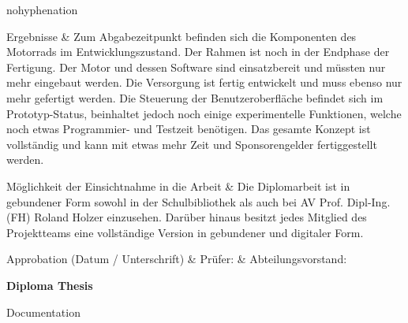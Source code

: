 {\begin{hyphenrules}{nohyphenation}
\begin{center}
\begin{mytable}
			\end{mytable}	
			\begin{mytable}
				Ergebnisse & Zum Abgabezeitpunkt befinden sich die Komponenten des Motorrads im Entwicklungszustand. Der Rahmen ist noch in der Endphase der Fertigung. Der Motor und dessen Software sind einsatzbereit und müssten nur mehr eingebaut werden. Die Versorgung ist fertig entwickelt und muss ebenso nur mehr gefertigt werden. Die Steuerung der Benutzeroberfläche befindet sich im Prototyp-Status, beinhaltet jedoch noch einige experimentelle Funktionen, welche noch etwas Programmier- und Testzeit benötigen. Das gesamte Konzept ist vollständig und kann mit etwas mehr Zeit und Sponsorengelder fertiggestellt werden. \\
			\end{mytable}\vskip-0.42cm
			\begin{mytable}
				Möglichkeit der Einsichtnahme in die Arbeit & Die Diplomarbeit ist in gebundener Form sowohl in der Schulbibliothek als auch bei AV Prof. Dipl-Ing. (FH) Roland Holzer einzusehen. Darüber hinaus besitzt jedes Mitglied des Projektteams eine vollständige Version in gebundener und digitaler Form.\\
			\end{mytable}\vskip-0.42cm
			\begin{mytable}[{|X[0.995,c]|X[1,m]|X[1,m]|}]
				Approbation \newline (Datum / Unterschrift) &
				\hbox{\footnotesize{Prüfer:}} &
				\hbox{\footnotesize{Abteilungsvorstand:}} \\
				\hline
			\end{mytable}
		\end{center}
	\end{hyphenrules}

\newpage

	\centering
\begin{huge}
	\textbf{Diploma Thesis}
\end{huge}

\begin{large}
	 Documentation
\end{large}

}
